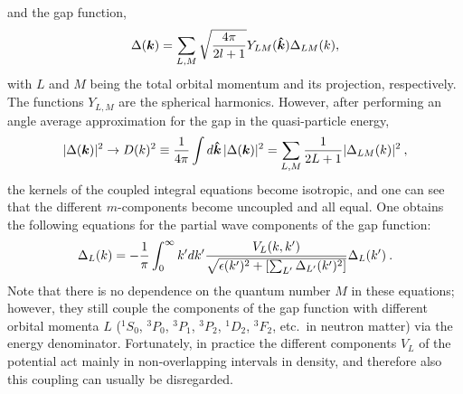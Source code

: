 \documentclass[rmp,aps,floatfix]{revtex4}
\begin{document}
and the gap function, 
\begin{equation}
  \Delta(\bm{k}) = 
  \sum_{L,M} \sqrt{4\pi\over 2l+1} Y_{LM}(\bm{\hat{k}}) \Delta_{LM}(k),
\end{equation}
with $L$ and $M$ being the total orbital momentum and its projection, respectively.
The functions $ Y_{L,M}$ are the spherical harmonics. 
However, after performing an angle average approximation for the gap in the
quasi-particle energy,
\begin{equation}
  |\Delta(\bm{k})|^2 \rightarrow D(k)^2 \equiv 
  {1\over 4\pi} \int d\bm{\hat{k}}\, |\Delta(\bm{k})|^2 =
  \sum_{L,M} {1\over 2L+1} |\Delta_{LM}(k)|^2 \:,
\end{equation}
the kernels of the coupled integral equations become isotropic, and one can 
see that the different $m$-components become uncoupled and all equal. 
One obtains the following equations for the 
partial wave components of the gap function:
\begin{equation}
  \Delta_L(k) = - {1\over\pi} \int_0^\infty 
  k' dk'{V_L(k,k') \over \sqrt{ \epsilon(k')^2 + 
  \left[\sum_{L'} \Delta_{L'}(k')^2 \right] }}
  \Delta_L(k') \:.
\end{equation}
Note that there is no dependence on the quantum number $M$ in these 
equations; however, they still couple the components of the
gap function with different orbital momenta $L$ 
($^1S_0$, $^3P_0$, $^3P_1$, $^3P_2$, $^1D_2$, $^3F_2$, etc.~in neutron matter) 
via the energy denominator.
Fortunately, in practice the different components $V_L$ of the potential
act mainly in non-overlapping intervals in density, 
and therefore also this coupling can usually be disregarded.
\end{document}

